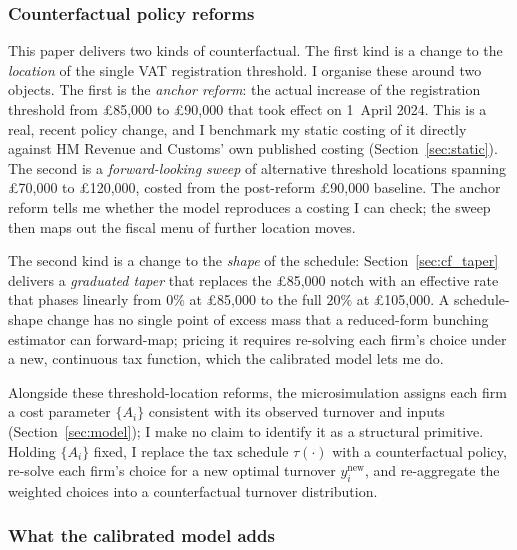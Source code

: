 \subsubsection{Counterfactual policy reforms}
\label{sec:counterfactuals}

This paper delivers two kinds of counterfactual. The first kind is a change to
the \emph{location} of the single VAT registration threshold. I organise these
around two objects. The first is the \emph{anchor reform}: the actual increase of
the registration threshold from \pounds85{,}000 to \pounds90{,}000 that took
effect on 1~April 2024. This is a real, recent policy change, and I benchmark my
static costing of it directly against HM Revenue and Customs' own published
costing (Section~\ref{sec:static}). The second is a \emph{forward-looking sweep}
of alternative threshold locations spanning \pounds70{,}000 to \pounds120{,}000,
costed from the post-reform \pounds90{,}000 baseline. The anchor reform tells me
whether the model reproduces a costing I can check; the sweep then maps out the
fiscal menu of further location moves.

The second kind is a change to the \emph{shape} of the schedule:
Section~\ref{sec:cf_taper} delivers a \emph{graduated taper} that replaces the
\pounds85{,}000 notch with an effective rate that phases linearly from $0\%$ at
\pounds85{,}000 to the full $20\%$ at \pounds105{,}000. A schedule-shape change has
no single point of excess mass that a reduced-form bunching estimator can
forward-map; pricing it requires re-solving each firm's choice under a new,
continuous tax function, which the calibrated model lets me do.

Alongside these threshold-location reforms, the microsimulation assigns each firm a
cost parameter $\{A_i\}$ consistent with its observed turnover and inputs
(Section~\ref{sec:model}); I make no claim to identify it as a structural
primitive. Holding $\{A_i\}$ fixed, I replace the tax schedule $\tau(\cdot)$ with a
counterfactual policy, re-solve each firm's choice for a new optimal turnover
$y_i^{\text{new}}$, and re-aggregate the weighted choices into a counterfactual
turnover distribution.

\subsubsection{What the calibrated model adds}
\label{sec:cf_valueadded}

